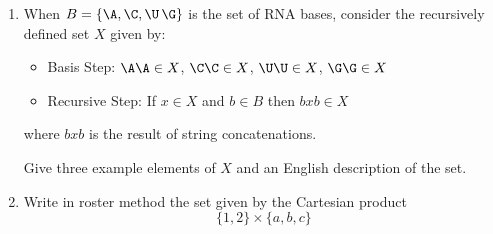 

\begin{enumerate}

    \item When $B = \{ \A, \C, \U\, \G\}$ is the set of RNA bases, 
    consider the recursively defined set $X$ given by:
    \begin{itemize}
    \item[] Basis Step: $\A\A \in X$, $\C\C \in X$, $\U\U \in X$, $\G\G \in X$
    \item[] Recursive Step: If $x \in X$ and $b \in B$ then $bxb \in X$
    \end{itemize}
    where $bxb$ is the result of string concatenations.

    Give three example elements of $X$ and an English description of the set.

    \item Write in roster method the set given by the Cartesian product
    \[ \{1,2\} \times \{a,b,c\}\]

\end{enumerate}
